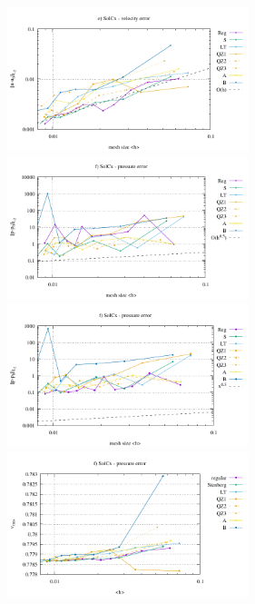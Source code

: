 \begin{center}
\includegraphics[width=7cm]{python_codes/fieldstone_78/results/mms_solvi/errors_V}
\includegraphics[width=7cm]{python_codes/fieldstone_78/results/mms_solvi/errors_P}\\
\includegraphics[width=7cm]{python_codes/fieldstone_78/results/mms_solvi/errors_Q}
\includegraphics[width=7cm]{python_codes/fieldstone_78/results/mms_solvi/vrms.pdf}
\end{center}














